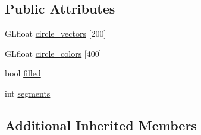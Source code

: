 \subsection*{Public Attributes}
\begin{DoxyCompactItemize}
\item 
G\-Lfloat \hyperlink{class_d_k_circle_af016b4d3b0231e38ea633d04236cd278}{circle\-\_\-vectors} \mbox{[}200\mbox{]}
\item 
G\-Lfloat \hyperlink{class_d_k_circle_aea872fa7867ed8adf1be511d3b9193c7}{circle\-\_\-colors} \mbox{[}400\mbox{]}
\item 
bool \hyperlink{class_d_k_circle_a161485ec488bf449fed83012e5dd678b}{filled}
\item 
int \hyperlink{class_d_k_circle_a2738abdd333fe7c300e7a705fde35d0c}{segments}
\end{DoxyCompactItemize}
\subsection*{Additional Inherited Members}


